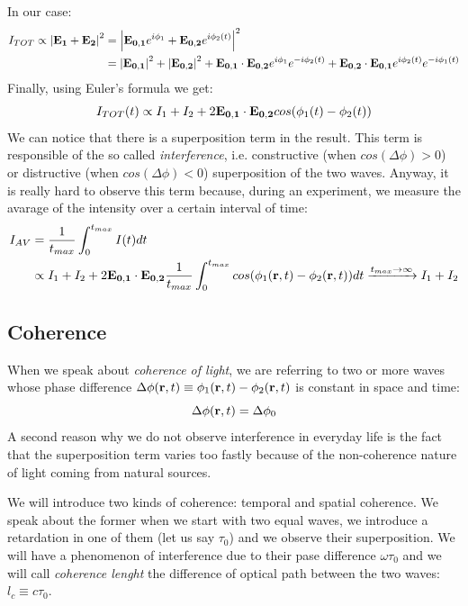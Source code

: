\documentclass[11pt,a4paper]{article}
\begin{document}
In our case:
\begin{align*}
I_{TOT}\propto \abs{\vb{E_1}+\vb{E_2}}^2 &=\abs{\vb{E_{0,1}}e^{i\phi_1}+\vb{E_{0,2}}e^{i\phi_2(t)}}^2\\
&=\abs{\vb{E_{0,1}}}^2+\abs{\vb{E_{0,2}}}^2+\vb{E_{0,1}}\cdot \vb{E_{0,2}}e^{i\phi_1}e^{-i\phi_2(t)}+\vb{E_{0,2}}\cdot \vb{E_{0,1}}e^{i\phi_2(t)}e^{-i\phi_1(t)}
\end{align*}
Finally, using Euler's formula we get:
\begin{equation}
I_{TOT}(t)\propto I_1+I_2+2\vb{E_{0,1}}\cdot \vb{E_{0,2}}cos(\phi_1(t)-\phi_2(t))
\end{equation}
We can notice that there is a superposition term in the result. This term is responsible of the so called \emph{interference}, i.e. constructive (when $cos(\Delta\phi)>0$) or distructive (when $cos(\Delta\phi)<0$) superposition of the two waves.  Anyway, it is really hard to observe this term because, during an experiment, we measure the avarage of the intensity over a certain interval of time:
\begin{align*}
I_{AV} &= \frac{1}{t_{max}}\int_0^{t_{max}}I(t)dt\\ &\propto I_1+I_2+ 2\vb{E_{0,1}}\cdot \vb{E_{0,2}} \frac{1}{t_{max}} \int_0^{t_{max}} cos(\phi_1(\vb{r},t)-\phi_2(\vb{r},t)) dt\xrightarrow{t_{max}\rightarrow \infty} I_1+I_2
\end{align*}


\subsection{Coherence}
When we speak about \emph{coherence of light}, we are referring to two or more waves whose phase difference $\Delta\phi(\vb{r},t)\equiv \phi_1(\vb{r},t)-\phi_2(\vb{r},t)$ is constant in space and time:
\begin{equation}
\Delta\phi(\vb{r},t)=\Delta\phi_0
\end{equation}
A second reason why we do not observe interference in everyday life is the fact that the superposition term varies too fastly because of the non-coherence nature of light coming from natural sources.

We will introduce two kinds of coherence: temporal and spatial coherence. We speak about the former when we start with two equal waves, we introduce a retardation in one of them (let us say $\tau_0$) and we observe their superposition. We will have a phenomenon of interference due to their pase difference $\omega \tau_0$ and we will call \emph{coherence lenght} the difference of optical path between the two waves: $l_c\equiv c\tau_0$.
\end{document}
